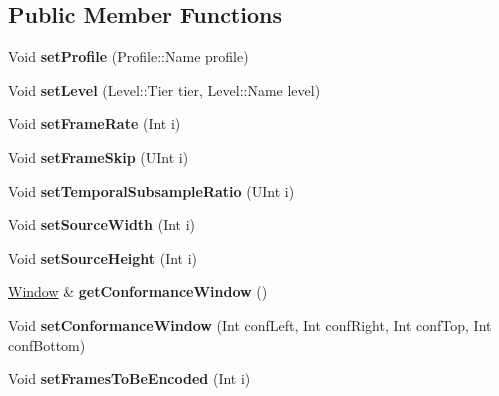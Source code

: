 \subsection*{Public Member Functions}
\begin{DoxyCompactItemize}
\item 
\mbox{\label{class_t_enc_cfg_a753f0502f0e466ff20142559564a922e}} 
Void {\bfseries set\+Profile} (Profile\+::\+Name profile)
\item 
\mbox{\label{class_t_enc_cfg_ab589bf0eca35ad328e247d2bbeec5a37}} 
Void {\bfseries set\+Level} (Level\+::\+Tier tier, Level\+::\+Name level)
\item 
\mbox{\label{class_t_enc_cfg_ad33d067b147b8aea83c6cf2a0cd755be}} 
Void {\bfseries set\+Frame\+Rate} (Int i)
\item 
\mbox{\label{class_t_enc_cfg_ad40706fcd10fdf985b01fca6d99e6814}} 
Void {\bfseries set\+Frame\+Skip} (U\+Int i)
\item 
\mbox{\label{class_t_enc_cfg_a36aa0e787877594645bffbd0ba6d22b9}} 
Void {\bfseries set\+Temporal\+Subsample\+Ratio} (U\+Int i)
\item 
\mbox{\label{class_t_enc_cfg_a2145fb9847ec17a97bbca505012d1291}} 
Void {\bfseries set\+Source\+Width} (Int i)
\item 
\mbox{\label{class_t_enc_cfg_a6b0c8b50ce4905b59029345a64e0aa31}} 
Void {\bfseries set\+Source\+Height} (Int i)
\item 
\mbox{\label{class_t_enc_cfg_a3d04b2b7f4eab36e756832e69ff144cf}} 
\hyperlink{class_window}{Window} \& {\bfseries get\+Conformance\+Window} ()
\item 
\mbox{\label{class_t_enc_cfg_a81ae91e17cf0d6bbb6aae452f9702a98}} 
Void {\bfseries set\+Conformance\+Window} (Int conf\+Left, Int conf\+Right, Int conf\+Top, Int conf\+Bottom)
\item 
\mbox{\label{class_t_enc_cfg_a704eaa19224d485ce27f2caa80f87272}} 
Void {\bfseries set\+Frames\+To\+Be\+Encoded} (Int i)

\end{DoxyCompactItemize}
